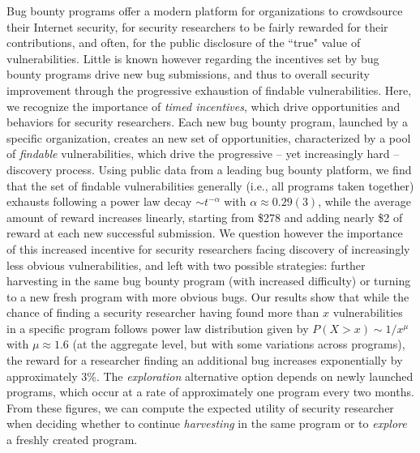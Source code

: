 Bug bounty programs offer a modern platform for organizations to crowdsource their Internet security, for security researchers to be fairly rewarded for their contributions, and often, for the public disclosure of the ``true" value of vulnerabilities. Little is known however regarding the incentives set by bug bounty programs drive new bug submissions, and thus to overall security improvement through the progressive exhaustion of findable vulnerabilities. Here, we recognize the importance of {\it timed incentives}, which drive opportunities and behaviors for security researchers. Each new bug bounty program, launched by a specific organization, creates an new set of opportunities, characterized by a pool of {\it findable} vulnerabilities, which drive the progressive -- yet increasingly hard -- discovery process. Using public data from a leading bug bounty platform, we find that the set of findable vulnerabilities generally (i.e., all programs taken together) exhausts following a power law decay $\sim t^{-\alpha}$ with $\alpha \approx 0.29(3)$, while the average amount of reward increases linearly, starting from \$278 and adding nearly \$2 of reward at each new successful submission. We question however the importance of this increased incentive for security researchers facing discovery of increasingly less obvious vulnerabilities, and left with two possible strategies: further harvesting in the same bug bounty program (with increased difficulty) or turning to a new fresh program with more obvious bugs. Our results show that while the chance of finding a security researcher having found more than $x$ vulnerabilities in a specific program follows power law distribution given by $P(X>x) \sim 1/x^{\mu}$ with $\mu \approx 1.6$ (at the aggregate level, but with some variations across programs), the reward for a researcher finding an additional bug increases exponentially by approximately 3\%. The {\it exploration} alternative option depends on newly launched programs, which occur at a rate of approximately one program every two months. From these figures, we can compute the expected utility of security researcher when deciding whether to continue {\it harvesting} in the same program or to {\it explore} a freshly created program.